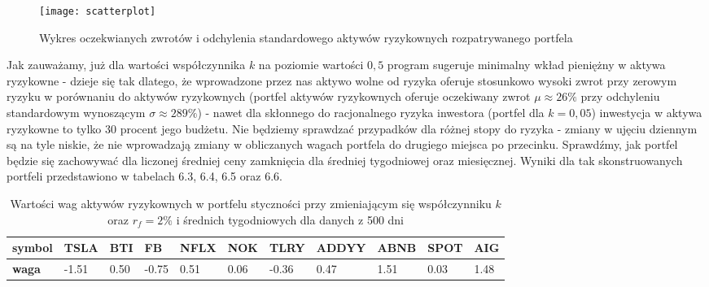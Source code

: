 \documentclass[magister]{dyplom}
\begin{document}
\begin{figure}[ht]
	\centering
	\texttt{[image: scatterplot]}
	\caption{Wykres oczekwianych zwrotów i odchylenia standardowego aktywów ryzykownych rozpatrywanego portfela}
\end{figure}
\newpage
Jak zauważamy, już dla wartości współczynnika $k$ na poziomie wartości $0,5$ program sugeruje minimalny wkład pieniężny w aktywa ryzykowne - dzieje się tak dlatego, że wprowadzone przez nas aktywo wolne od ryzyka oferuje stosunkowo wysoki zwrot przy zerowym ryzyku w porównaniu do aktywów ryzykownych (portfel aktywów ryzykownych oferuje oczekiwany zwrot $\mu \approx 26\%$ przy odchyleniu standardowym wynoszącym $\sigma \approx 289\%$) - nawet dla skłonnego do racjonalnego ryzyka inwestora (portfel dla $k = 0,05$) inwestycja w aktywa ryzykowne to tylko 30 procent jego budżetu. Nie będziemy sprawdzać przypadków dla różnej stopy do ryzyka - zmiany w ujęciu dziennym są na tyle niskie, że nie wprowadzają zmiany w obliczanych wagach portfela do drugiego miejsca po przecinku. Sprawdźmy, jak portfel będzie się zachowywać dla liczonej średniej ceny zamknięcia dla średniej tygodniowej oraz miesięcznej. Wyniki dla tak skonstruowanych portfeli przedstawiono w tabelach 6.3, 6.4, 6.5 oraz 6.6.
\begin{table}[ht]
	\centering
	\caption{Wartości wag aktywów ryzykownych w portfelu styczności przy zmieniającym się współczynniku $k$ oraz $r_f = 2\%$ i średnich tygodniowych dla danych z 500 dni}
	\begin{tabular}{|l|l|l|l|l|l|l|l|l|l|l|}
		\hline
		\textbf{symbol} & \textbf{TSLA} & \textbf{BTI} & \textbf{FB} & \textbf{NFLX} & \textbf{NOK} & \textbf{TLRY} & \textbf{ADDYY} & \textbf{ABNB} & \textbf{SPOT} & \textbf{AIG} \\ \hline
		\textbf{waga}   & -1.51       & 0.50          & -0.75           & 0.51        & 0.06         & -0.36         & 0.47        & 1.51          & 0.03          & 1.48        \\ \hline
	\end{tabular}
\end{table}
\end{document}
